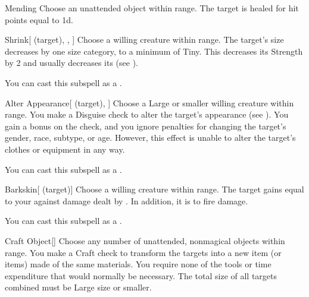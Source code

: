 \begin{ability}[\nth{1}]{Mending}
Choose an unattended object within \rngclose range.
The target is healed for hit points equal to  \plus1d.
\end{ability}
\vspace{0.25em}


\begin{ability}[\nth{1}]{Shrink}[ (target), , ]
Choose a willing creature within \rngclose range.
The target's size decreases by one size category, to a minimum of Tiny.
This decreases its Strength by 2 and usually decreases its  (see ).

You can cast this subspell as a .
\end{ability}
\vspace{0.25em}


\begin{ability}[\nth{2}]{Alter Appearance}[ (target), ]
Choose a Large or smaller willing creature within \rngclose range.
You make a Disguise check to alter the target's appearance (see ).
You gain a  bonus on the check, and you ignore penalties for changing the target's gender, race, subtype, or age.
However, this effect is unable to alter the target's clothes or equipment in any way.

You can cast this subspell as a .
\end{ability}
\vspace{0.25em}


\begin{ability}[\nth{2}]{Barkskin}[ (target)]
Choose a willing creature within \rngclose range.
The target gains  equal to your  against damage dealt by .
In addition, it is  to fire damage.

You can cast this subspell as a .
\end{ability}
\vspace{0.25em}


\begin{ability}[\nth{3}]{Craft Object}[]
Choose any number of unattended, nonmagical objects within \rngclose range.
You make a Craft check to transform the targets into a new item (or items) made of the same materials.
You require none of the tools or time expenditure that would normally be necessary.
The total size of all targets combined must be Large size or smaller.
\end{ability}
\vspace{0.25em}


